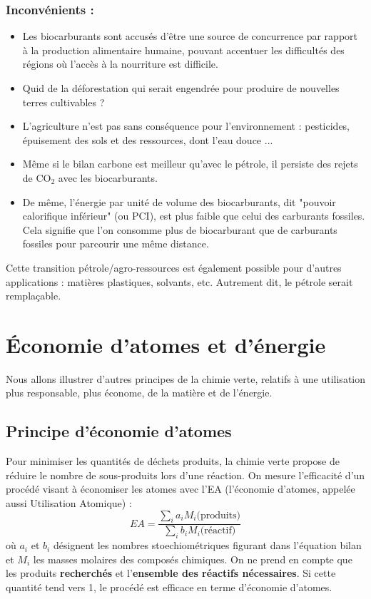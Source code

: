 \documentclass[11pt,a4paper]{report}
\begin{document}
\subsubsection{Inconvénients :}
\begin{itemize}
	\item Les biocarburants sont accusés d'être une source de concurrence par rapport à la production 			alimentaire humaine, pouvant accentuer les difficultés des régions où l'accès à la nourriture 			est difficile.
	\item Quid de la déforestation qui serait engendrée pour produire de nouvelles terres cultivables ?
	\item L'agriculture n'est pas sans conséquence pour l'environnement : pesticides, épuisement des 			sols et des ressources, dont l'eau douce ...
	\item Même si le bilan carbone est meilleur qu'avec le pétrole, il persiste des rejets de 
	$\text{CO}_2$ avec les biocarburants.
	\item De même, l'énergie par unité de volume des biocarburants, dit "pouvoir calorifique
	inférieur" (ou PCI), est plus faible que celui des carburants fossiles. Cela signifie que l'on 			consomme plus de biocarburant que de carburants fossiles pour parcourir une même distance.\\
\end{itemize}

Cette transition pétrole/agro-ressources est également possible pour d'autres applications : matières plastiques, solvants, etc. Autrement dit, le pétrole serait remplaçable.

\section{Économie d'atomes et d'énergie}\label{sec:2}

Nous allons illustrer d'autres principes de la chimie verte, relatifs à une utilisation plus responsable, plus économe, de la matière et de l'énergie.

\subsection{Principe d'économie d'atomes}

Pour minimiser les quantités de déchets produits, la chimie verte propose de réduire le nombre de sous-produits lors d'une réaction. On mesure l'efficacité d'un procédé visant à économiser les atomes avec l'EA (l'économie d'atomes, appelée aussi Utilisation Atomique) :
\begin{equation}
	\boxed{EA = \frac{\sum_i a_i M_i\text{(produits)}}{\sum_i b_i M_i\text{(réactif)}}}
\end{equation}
où $a_i$ et $b_i$ désignent les nombres stoechiométriques figurant dans l'équation bilan et $M_i$ les masses molaires des composés chimiques. On ne prend en compte que les produits \textbf{recherchés} et l'\textbf{ensemble des réactifs nécessaires}. Si cette quantité tend vers 1, le procédé est efficace en terme d'économie d'atomes.
\end{document}
